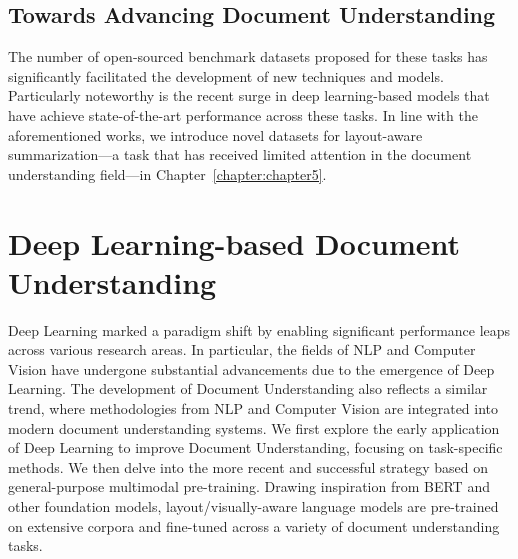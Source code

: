 
\subsection{Towards Advancing Document Understanding}

The number of open-sourced benchmark datasets proposed for these tasks has significantly facilitated the development of new techniques and models. Particularly noteworthy is the recent surge in deep learning-based models that have achieve state-of-the-art performance across these tasks. In line with the aforementioned works, we introduce novel datasets for layout-aware summarization—a task that has received limited attention in the document understanding field—in Chapter~\ref{chapter:chapter5}. 


\section{Deep Learning-based Document Understanding}

Deep Learning marked a paradigm shift by enabling significant performance leaps across various research areas. In particular, the fields of \ac{NLP} and Computer Vision have undergone substantial advancements due to the emergence of Deep Learning. The development of Document Understanding also reflects a similar trend, where methodologies from \ac{NLP} and Computer Vision are integrated into modern document understanding systems. We first explore the early application of Deep Learning to improve Document Understanding, focusing on task-specific methods. We then delve into the more recent and successful strategy based on general-purpose multimodal pre-training. Drawing inspiration from \ac{BERT} and other foundation models, layout/visually-aware language models are pre-trained on extensive corpora and fine-tuned across a variety of document understanding tasks.

